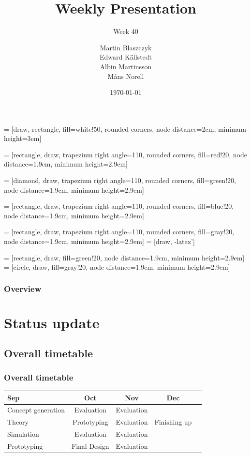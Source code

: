\documentclass{beamer}
\title{Weekly Presentation}
\subtitle{Week 40}
\author{Martin Blaszczyk\\
        Edward Källstedt \\
        Albin Martinsson\\
        Måns Norell
        }
\institute{Luleå University of Technology}
\date{\today}
\begin{document}
 = [draw, rectangle, fill=white!50, rounded corners, node distance=2cm, 
                    minimum height=3em] 
                    
 = [rectangle, draw, trapezium right angle=110, rounded corners, 
                  fill=red!20, node distance=1.9cm, minimum height=2.9em] 

 = [diamond, draw, trapezium right angle=110, rounded corners, 
                  fill=green!20, node distance=1.9cm, minimum height=2.9em] 
                  
 = [rectangle, draw, trapezium right angle=110, rounded corners, 
                  fill=blue!20, node distance=1.9cm, minimum height=2.9em] 

 = [rectangle, draw, trapezium right angle=110, rounded corners, 
                  fill=gray!20, node distance=1.9cm, minimum height=2.9em]
 = [draw, -latex']  

 = [rectangle, draw, fill=green!20, node distance=1.9cm, minimum height=2.9em]
 = [circle, draw, 
                  fill=gray!20, node distance=1.9cm, minimum height=2.9em]



\begin{frame}
    \titlepage
\end{frame}

\begin{frame}
    \frametitle{Overview}
    \tableofcontents
\end{frame}
\section{Status update}
\begin{frame}
    \subsection{Overall timetable}
    \frametitle{Overall timetable}
    \begin{table}
        \begin{tabular}{| l | c | c | c | c }
            
            Sep & Oct & Nov & Dec \\
            \hline \hline
            Concept generation & Evaluation & Evaluation &  \\ 
            \hline
            Theory & Prototyping & Evaluation & Finishing up \\
            \hline
            Simulation & Evaluation & Evaluation & \\
            \hline
            Prototyping & Final Design & Evaluation &  \\
            \hline
 
        \end{tabular}
    \end{table}    
\end{frame}
\end{document}
